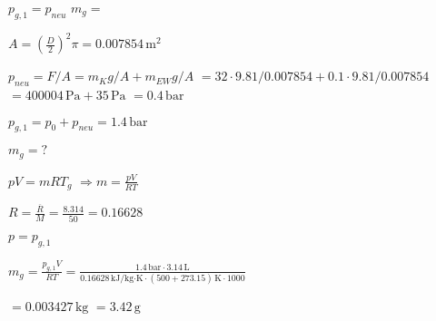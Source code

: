 \( p_{g,1} = p_{neu} \)  
\( m_g = \)  

\( A = \left( \frac{D}{2} \right)^2 \pi = 0.007854 \, \text{m}^2 \)  

\( p_{neu} = F / A = m_K g / A + m_{EW} g / A \)  
\( = 32 \cdot 9.81 / 0.007854 + 0.1 \cdot 9.81 / 0.007854 \)  
\( = 400004 \, \text{Pa} + 35 \, \text{Pa} \)  
\( = 0.4 \, \text{bar} \)  

\( p_{g,1} = p_0 + p_{neu} = 1.4 \, \text{bar} \)  

\( m_g = ? \)  

\( p V = m R T_g \)  
\( \Rightarrow m = \frac{p V}{R T} \)  

\( R = \frac{\overline{R}}{M} = \frac{8.314}{50} = 0.16628 \)  

\( p = p_{g,1} \)  

\( m_g = \frac{p_{g,1} V}{R T} = \frac{1.4 \, \text{bar} \cdot 3.14 \, \text{L}}{0.16628 \, \text{kJ/kg·K} \cdot (500 + 273.15) \, \text{K} \cdot 1000} \)  

\( = 0.003427 \, \text{kg} \)  
\( = 3.42 \, \text{g} \)